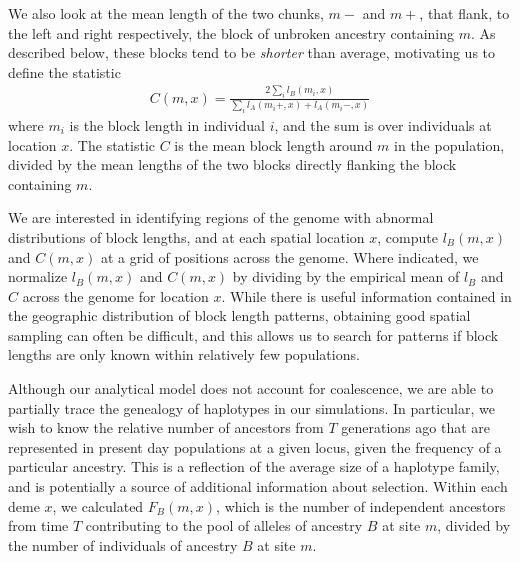 \documentclass[11pt,letterpaper]{article}
\begin{document}
We also look at the mean length of the two chunks, $m-$ and $m+$, that flank, to the left and right respectively, 
the block of unbroken ancestry containing $m$. 
As described below, these blocks tend to be \emph{shorter} than average,
motivating us to define the statistic
\begin{align*}
     C(m,x) =  \frac{2\sum_i{l_B(m_i,x)}}{\sum_i{l_A(m_i+,x)+l_A(m_i-,x)}}
\end{align*}
where $m_i$ is the block length in individual $i$, and the sum is over individuals at location $x$.
The statistic $C$ is the mean block length around $m$ in the population, 
divided by the mean lengths of the two blocks directly flanking the block containing $m$. 

We are interested in identifying regions of the genome with abnormal distributions of block lengths, 
and at each spatial location $x$, compute $l_B(m,x)$ and $C(m,x)$ at a grid of positions across the genome. 
Where indicated, we normalize $l_B(m,x)$ and $C(m,x)$ by dividing by the empirical mean of $l_B$ and $C$ across the genome for location $x$.
While there is useful information contained in the geographic distribution of block length patterns, 
obtaining good spatial sampling can often be difficult, 
and this allows us to search for patterns if block lengths are only known within relatively few populations. 

Although our analytical model does not account for coalescence, we are able to partially trace the genealogy of haplotypes in our simulations. In particular, we wish to know the relative number of ancestors from $T$ generations ago that are represented in present day populations at a given locus, given the frequency of a particular ancestry. This is a reflection of the average size of a haplotype family, and is potentially a source of additional information about selection. Within each deme $x$, we calculated $F_B(m,x)$, which is the number of independent ancestors from time $T$ contributing to the pool of alleles of ancestry $B$ at site $m$, divided by the number of individuals of ancestry $B$ at site $m$.


\end{document}
